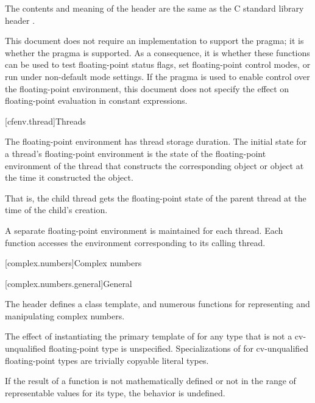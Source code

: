 \pnum
The contents and meaning of the header 
are the same as the C standard library header .
\begin{note}
This document does not require an implementation to support the
 pragma;
it is 
whether the pragma is supported. As a consequence,
it is 
whether these functions can be used to test floating-point status flags,
set floating-point control modes, or run under non-default mode settings.
If the pragma is used to enable control over the floating-point environment,
this document does not specify the effect on
floating-point evaluation in constant expressions.
\end{note}


[cfenv.thread]{Threads}

\pnum
The floating-point environment has thread storage
duration. The initial state for a thread's floating-point
environment is the state of the floating-point environment of the thread that constructs
the corresponding  object
or  object
at the time it
constructed the object.
\begin{note}
That is, the child thread gets the floating-point
state of the parent thread at the time of the child's creation.
\end{note}

\pnum
A separate floating-point environment is maintained for each thread. Each function
accesses the environment corresponding to its calling thread.

[complex.numbers]{Complex numbers}

[complex.numbers.general]{General}

\pnum
The header  defines a class template,
and numerous functions for representing and manipulating complex numbers.

\pnum
The effect of instantiating the primary template of  for any type
that is not a cv-unqualified floating-point type
is unspecified.
Specializations of  for cv-unqualified floating-point types
are trivially copyable literal types.

\pnum
If the result of a function is not mathematically defined or not in
the range of representable values for its type, the behavior is
undefined.

